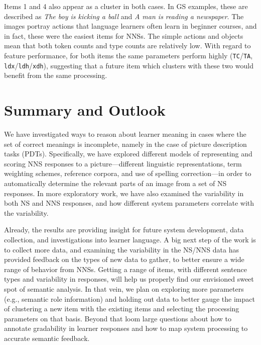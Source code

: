 \documentclass[11pt,letterpaper]{article}
\newcommand{\param}[1]{\texttt{#1}}
\newcommand{\md}[1]{\marginpar{\scriptsize MD: #1}}
\newcommand{\lk}[1]{\marginpar{\scriptsize LK: #1}}
\renewcommand{\marginpar}[1]{}
\begin{document}
Items 1 and 4 also appear as a cluster in both cases. In GS examples,
these are described as \textit{The boy is kicking a ball} and
\textit{A man is reading a newspaper}. The images portray actions that
language learners often learn in beginner courses, and in fact, these
were the easiest items for NNSs. The simple actions and objects mean
that both token counts and type counts are relatively low. \md{Just to make sure: are these still the right parameters that perform highly?}\lk{I changed it slightly; these are best, but the trend isn't very strong via MAP. the trends are different via Raw, (and stronger, hence the cluster!) but I don't think we want to go into that, given that we present the MAP for item 1 in Table 4} With regard
to feature performance, for both items the same parameters perform
highly (\param{TC}/\param{TA}, \param{ldx}/\param{ldh}/\param{xdh}), suggesting that a future item
which clusters with these two would benefit from the same processing.


\section{Summary and Outlook}

We have investigated ways to reason about learner meaning in cases
where the set of correct meanings is incomplete, namely in the
case of picture description tasks (PDTs).  Specifically, we have
explored different models of representing and scoring NNS responses to
a picture---different linguistic representations, term weighting
schemes, reference corpora, and use of spelling correction---in order
to automatically determine the relevant parts of an image from a set
of NS responses.  In more exploratory work, we have also examined the
variability in both NS and NNS responses, and how different system
parameters correlate with the variability.  

Already, the results are providing insight for future system
development, data collection, and investigations into learner
language.  A big next step of the work is to collect more data, and
examining the variability in the NS/NNS data has provided feedback on
the types of new data to gather, to better ensure a wide range of
behavior from NNSs.  Getting a range of items, with different sentence
types and variability in responses, will help us properly find our
envisioned sweet spot of semantic analysis.  In that vein, we plan on
exploring more parameters (e.g., semantic role information) and
holding out data to better gauge the impact of clustering a new item
with the existing items and selecting the processing parameters on
that basis.
%
Beyond that loom large questions about how to annotate gradability in
learner responses and how to map system processing to accurate
semantic feedback.
\end{document}
